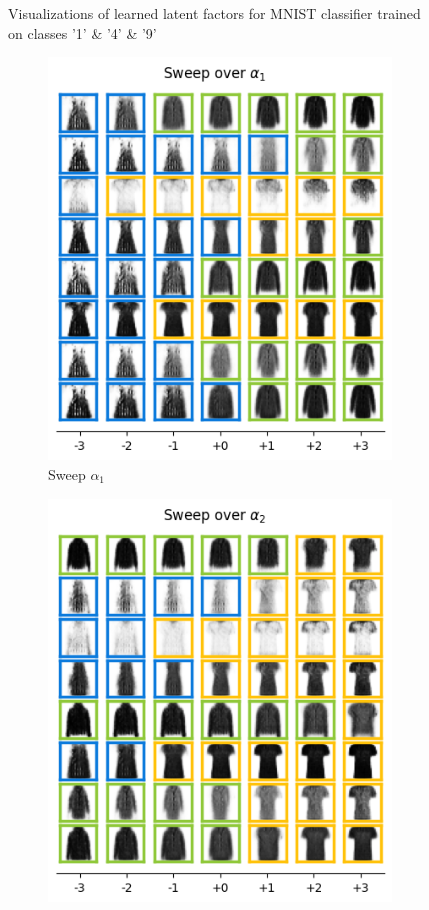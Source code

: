 \begin{figure}[h]
	\caption{Visualizations of learned latent factors for MNIST classifier trained on classes '1' \& '4' \& '9'}
	\label{fig:mnist_results 149 complete}
\end{figure}

\begin{figure}[h]
	\centering
	\begin{subfigure}[t]{.25\linewidth}
		\includegraphics[width=.9\textwidth]{../openreview/pictures/fmnist/alpha_1.png}
		\caption{Sweep $\alpha_1$}
		\label{fig:alpha_1}
	\end{subfigure}
	\begin{subfigure}[t]{.25\linewidth}
		\includegraphics[width=.9\textwidth]{../openreview/pictures/fmnist/alpha_2.png}

\end{subfigure}
\end{figure}
